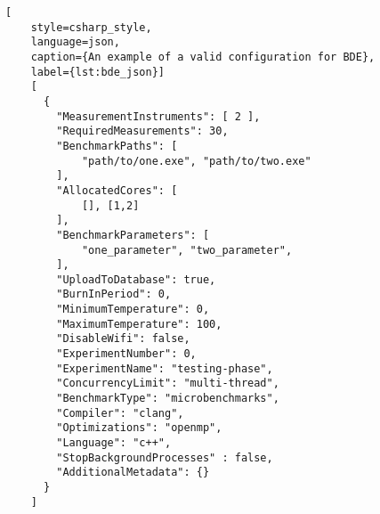 
\begin{lstlisting}[
    style=csharp_style,
    language=json, 
    caption={An example of a valid configuration for BDE},
    label={lst:bde_json}]
    [
      {
        "MeasurementInstruments": [ 2 ],
        "RequiredMeasurements": 30,
        "BenchmarkPaths": [
            "path/to/one.exe", "path/to/two.exe" 
        ],
        "AllocatedCores": [
            [], [1,2]
        ],
        "BenchmarkParameters": [ 
            "one_parameter", "two_parameter",
        ],
        "UploadToDatabase": true,
        "BurnInPeriod": 0,
        "MinimumTemperature": 0,
        "MaximumTemperature": 100,
        "DisableWifi": false,
        "ExperimentNumber": 0,
        "ExperimentName": "testing-phase",
        "ConcurrencyLimit": "multi-thread",
        "BenchmarkType": "microbenchmarks",
        "Compiler": "clang",
        "Optimizations": "openmp",
        "Language": "c++",
        "StopBackgroundProcesses" : false,
        "AdditionalMetadata": {}
      }
    ]

\end{lstlisting}